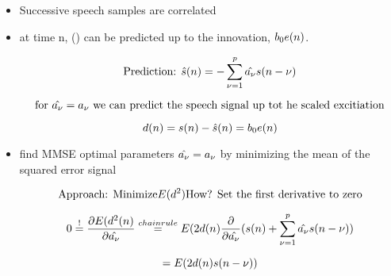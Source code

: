 \begin{itemize}

\item Successive speech samples are correlated

\item at time n, \filtOutFunc(\indexTime) can be predicted up to the innovation, \begin{math}b_0e(n)\end{math}.

\begin{equation*}\mbox{Prediction: }\hat{s}(n) = - \sum_{\nu =  1}^{p}\hat{a_{\nu}}s(n - \nu)\end{equation*}

\begin{equation*}\mbox{for \begin{math}\hat{a_{\arConvIndex}}=a_{\arConvIndex}\end{math} we can predict the speech signal up tot he scaled excitiation}\end{equation*}

\begin{equation*}d(n)=s(n)-\hat{s}(n)=b_0e(n)  \end{equation*}

\item find MMSE optimal parameters  \begin{math}\hat{a_{\nu}}=a_{\nu}\end{math} by minimizing the mean of the squared error signal

\begin{equation*}\mbox{Approach: Minimize}\MakeUppercase{\excitationFunc}(\predictionError^2)\mbox{How? Set the first derivative to zero}\end{equation*}

\begin{equation*}0 \stackrel{!}{=} \frac{\partial E(d^2(n)}{\partial\hat{a_{\nu}}} \stackrel{chain rule}{=}E(2d(n)\frac{\partial}{\partial\hat{a_{\nu}}}(s(n) + \sum_{\nu =  1}^{p}\hat{a_{\nu}}s(n - \nu))\end{equation*}

\begin{equation*} = E(2d(n)s(n - \nu))\end{equation*}



\end{itemize}
